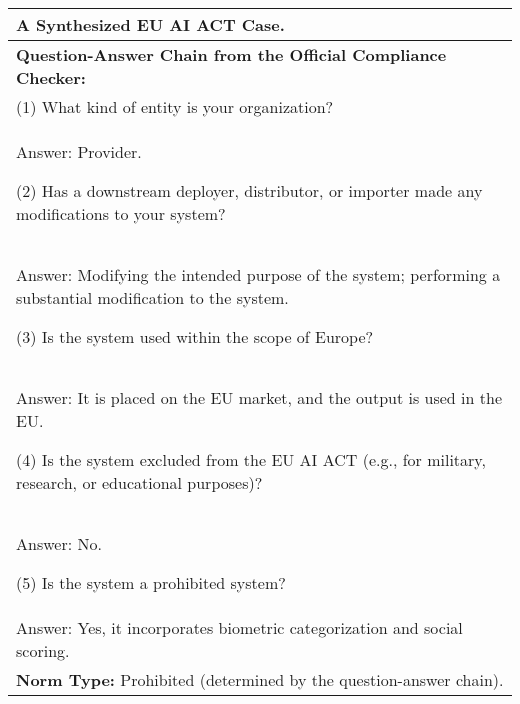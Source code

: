 \begin{table*}[t]

\small
\centering
\begin{tabular}{p{}}
\toprule
\textbf{A Synthesized EU AI ACT Case.} \\
\midrule

\textbf{Question-Answer Chain from the Official Compliance Checker: } \\
(1) What kind of entity is your organization? \\
\hspace{3.5mm} Answer: Provider.

(2) Has a downstream deployer, distributor, or importer made any modifications to your system? \\
\hspace{3.5mm} Answer: Modifying the intended purpose of the system; performing a substantial modification to the system.

(3) Is the system used within the scope of Europe? \\
\hspace{3.5mm} Answer: It is placed on the EU market, and the output is used in the EU.

(4) Is the system excluded from the EU AI ACT (e.g., for military, research, or educational purposes)? \\
\hspace{3.5mm} Answer: No.

(5) Is the system a prohibited system? \\
\hspace{3.5mm} Answer: Yes, it incorporates biometric categorization and social scoring. \\
\textbf{Norm Type: } Prohibited (determined by the question-answer chain). \\
\midrule


\end{tabular}
\end{table*}
